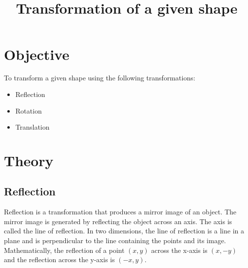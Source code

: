 \documentclass[12pt]{article}
\title{Transformation of a given shape}
\date{}
\author{}
\begin{document}
	\maketitle
	\vspace{-2cm}

	\section{Objective}
	To transform a given shape using the following transformations:
	\begin{itemize}
		\item Reflection
		\item Rotation
		\item Translation
	\end{itemize}
	
	\section{Theory}
	\subsection{Reflection}
	Reflection is a transformation that produces a mirror image of an object. The mirror image is generated by reflecting the object across an axis. The axis is called the line of reflection.
	In two dimensions, the line of reflection is a line in a plane and is perpendicular to the line containing the points and its image.
	Mathematically, the reflection of a point $(x,y)$ across the x-axis is $(x,-y)$ and the reflection across the y-axis is $(-x,y)$.
\end{document}
